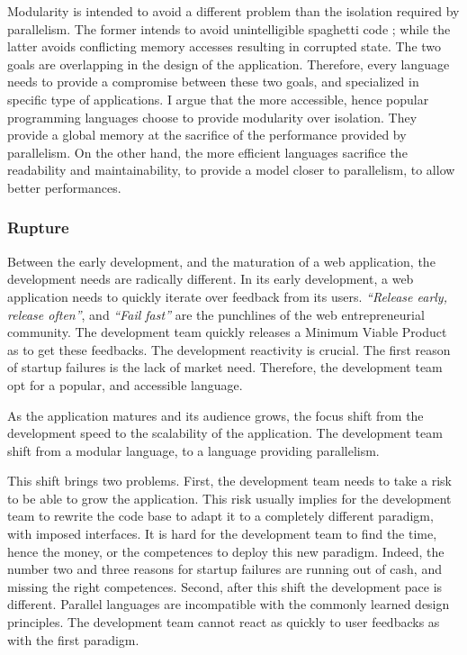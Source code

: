 Modularity is intended to avoid a different problem than the isolation required by parallelism.
The former intends to avoid unintelligible spaghetti code ; while the latter avoids conflicting memory accesses resulting in corrupted state.
The two goals are overlapping in the design of the application.
Therefore, every language needs to provide a compromise between these two goals, and specialized in specific type of applications.
I argue that the more accessible, hence popular programming languages choose to provide modularity over isolation.
They provide a global memory at the sacrifice of the performance provided by parallelism.
On the other hand, the more efficient languages sacrifice the readability and maintainability, to provide a model closer to parallelism, to allow better performances.


\subsubsection{Rupture}

Between the early development, and the maturation of a web application, the development needs are radically different.
In its early development, a web application needs to quickly iterate over feedback from its users.
\textit{``Release early, release often''}, and \textit{``Fail fast''} are the punchlines of the web entrepreneurial community.
The development team quickly releases a Minimum Viable Product as to get these feedbacks.
The development reactivity is crucial.
The first reason of startup failures is the lack of market need.
Therefore, the development team opt for a popular, and accessible language.

As the application matures and its audience grows, the focus shift from the development speed to the scalability of the application.
The development team shift from a modular language, to a language providing parallelism.


This shift brings two problems.
First, the development team needs to take a risk to be able to grow the application.
This risk usually implies for the development team to rewrite the code base to adapt it to a completely different paradigm, with imposed interfaces.
It is hard for the development team to find the time, hence the money, or the competences to deploy this new paradigm.
Indeed, the number two and three reasons for startup failures are running out of cash, and missing the right competences.
Second, after this shift the development pace is different.
Parallel languages are incompatible with the commonly learned design principles.
The development team cannot react as quickly to user feedbacks as with the first paradigm.

